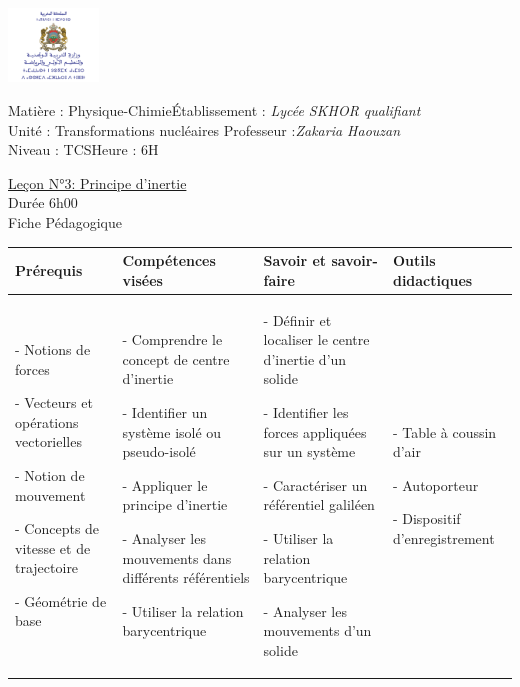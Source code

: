 \documentclass[13pt]{article}
\newcommand\headerMe[2]{\noindent{}#1\hfill#2}
\begin{document}
\begin{center}
	\includegraphics[width = 0.18\textwidth]{./img/logoMin.png}
	\vspace{-3cm}
\end{center}
\headerMe{Matière : Physique-Chimie}{Établissement : \emph{Lycée SKHOR qualifiant}}\\
\headerMe{ Unité :  Transformations nucléaires}{  Professeur :\emph{Zakaria Haouzan}}\\
\headerMe{Niveau : TCS}{Heure : 6H}\\

\begin{center}
	\vspace{1cm}
	\underline{Leçon N°3: Principe d’inertie}\\
	Durée 6h00
	\\
	\vspace{.2cm}
	\hrulefill
	\Large{Fiche Pédagogique}
	\hrulefill\\
\end{center}


\begin{center}
	\begin{tabular}{|p{}||p{}||p{}||p{}|}
		\hline
		\textbf{Prérequis} & \textbf{Compétences visées } & \textbf{Savoir et savoir-faire} & \textbf{Outils didactiques } \\
		\hline
		- Notions de forces

		- Vecteurs et opérations vectorielles

		- Notion de mouvement

		- Concepts de vitesse et de trajectoire

		- Géométrie de base
		                   &
		- Comprendre le concept de centre d'inertie

		- Identifier un système isolé ou pseudo-isolé

		- Appliquer le principe d'inertie

		- Analyser les mouvements dans différents référentiels

		- Utiliser la relation barycentrique
		                   &


		- Définir et localiser le centre d'inertie d'un solide

		- Identifier les forces appliquées sur un système

		- Caractériser un référentiel galiléen

		- Utiliser la relation barycentrique

		- Analyser les mouvements d'un solide
		                   &
		- Table à coussin d'air

		- Autoporteur

		- Dispositif d'enregistrement


		\\
		\hline
	\end{tabular}
\end{center}
\end{document}
